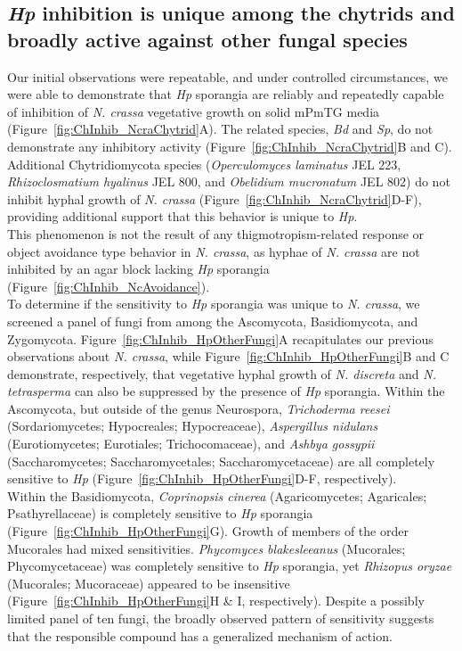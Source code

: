 \subsection{\textit{Hp} inhibition is unique among the chytrids and broadly active against other fungal species}
Our initial observations were repeatable, and under controlled circumstances, we were able to demonstrate that \textit{Hp} sporangia are reliably and repeatedly capable of inhibition of \textit{N. crassa} vegetative growth on solid mPmTG media (Figure~\ref{fig:ChInhib_NcraChytrid}A). The related species, \textit{Bd} and \textit{Sp}, do not demonstrate any inhibitory activity (Figure~\ref{fig:ChInhib_NcraChytrid}B and C). Additional Chytridiomycota species (\textit{Operculomyces laminatus} JEL 223, \textit{Rhizoclosmatium hyalinus} JEL 800, and \textit{Obelidium mucronatum} JEL 802) do not inhibit hyphal growth of \textit{N. crassa} (Figure~\ref{fig:ChInhib_NcraChytrid}D-F), providing additional support that this behavior is unique to \textit{Hp}. \\
\indent This phenomenon is not the result of any thigmotropism-related response or object avoidance type behavior in \textit{N. crassa}, as hyphae of \textit{N. crassa} are not inhibited by an agar block lacking \textit{Hp} sporangia (Figure~\ref{fig:ChInhib_NcAvoidance}).\\
\indent To determine if the sensitivity to \textit{Hp} sporangia was unique to \textit{N. crassa}, we screened a panel of fungi from among the Ascomycota, Basidiomycota, and Zygomycota. Figure~\ref{fig:ChInhib_HpOtherFungi}A recapitulates our previous observations about \textit{N. crassa}, while Figure~\ref{fig:ChInhib_HpOtherFungi}B and C demonstrate, respectively, that vegetative hyphal growth of \textit{N. discreta} and \textit{N. tetrasperma} can also be suppressed by the presence of \textit{Hp} sporangia.
\indent Within the Ascomycota, but outside of the genus Neurospora, \textit{Trichoderma reesei} (Sordariomycetes; Hypocreales; Hypocreaceae), \textit{Aspergillus nidulans} (Eurotiomycetes; Eurotiales; Trichocomaceae), and \textit{Ashbya gossypii} (Saccharomycetes; Saccharomycetales; Saccharomycetaceae) are all completely sensitive to \textit{Hp} (Figure~\ref{fig:ChInhib_HpOtherFungi}D-F, respectively). \\
\indent Within the Basidiomycota, \textit{Coprinopsis cinerea} (Agaricomycetes; Agaricales; Psathyrellaceae) is completely sensitive to \textit{Hp} sporangia (Figure~\ref{fig:ChInhib_HpOtherFungi}G). Growth of members of the order Mucorales had mixed sensitivities. \textit{Phycomyces blakesleeanus} (Mucorales; Phycomycetaceae) was completely sensitive to \textit{Hp} sporangia, yet \textit{Rhizopus oryzae} (Mucorales; Mucoraceae) appeared to be insensitive (Figure~\ref{fig:ChInhib_HpOtherFungi}H \& I, respectively). Despite a possibly limited panel of ten fungi, the broadly observed pattern of sensitivity suggests that the responsible compound has a generalized mechanism of action.\\
